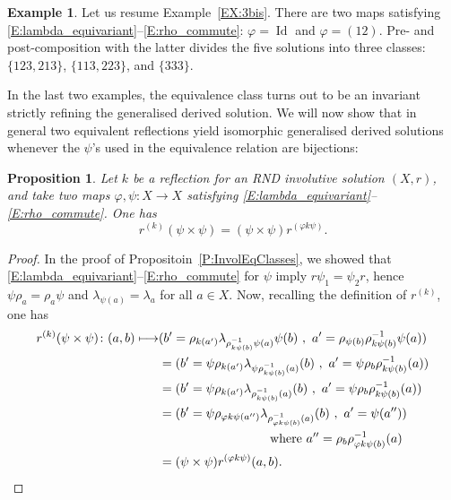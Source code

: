 \documentclass{amsart}
\newcommand{\Id}{\operatorname{Id}}
\theoremstyle{plain}
\newtheorem{pro}[thm]{Proposition}
\theoremstyle{definition}
\newtheorem{exa}[thm]{Example}
\theoremstyle{remark}
\begin{document}
\begin{exa}
Let us resume Example~\ref{EX:3bis}. There are two maps satisfying \eqref{E:lambda_equivariant}--\eqref{E:rho_commute}:  $\varphi=\Id$ and $\varphi=(12)$. Pre- and post-composition with the latter divides the five solutions into three classes: $\{123,213\}$, $\{113,223\}$, and $\{333\}$.
\end{exa}

In the last two examples, the equivalence class turns out to be an invariant strictly refining the generalised derived solution. We will now show that in general two equivalent reflections yield isomorphic generalised derived solutions whenever the $\psi$'s used in the equivalence relation are bijections:

\begin{pro}\label{P:EquivReflVsDerivedSol}
Let $k$ be a reflection for an RND involutive solution $(X,r)$, and take two maps $\varphi,\psi \colon X \to X$ satisfying \eqref{E:lambda_equivariant}--\eqref{E:rho_commute}. One has
\[r^{(k)} (\psi \times \psi) = (\psi \times \psi) r^{(\varphi k \psi)}.\]
\end{pro}

\begin{proof}
In the proof of Propositoin~\ref{P:InvolEqClasses}, we showed that \eqref{E:lambda_equivariant}--\eqref{E:rho_commute} for $\psi$ imply $r\psi _1=\psi _2r$, hence $\psi \rho_a = \rho_a \psi$ and $\lambda_{\psi(a)}=\lambda_a$ for all $a \in X$. Now, recalling the definition of $r^{(k)}$, one has
\begin{align*}
r^{(k)} (\psi \times \psi) \colon (a,b) \longmapsto &(b'= \rho_{k(a')}\lambda_{\rho_{k\psi(b)}^{-1}\psi(a)}\psi(b)\ ,\ a'=  \rho_{\psi(b)}\rho_{k\psi(b)}^{-1}\psi(a))\\
&=(b' = \psi\rho_{k(a')}\lambda_{\psi\rho_{k\psi(b)}^{-1}(a)}(b)\ ,\ a'=  \psi\rho_{b}\rho_{k\psi(b)}^{-1}(a))\\
&=(b' = \psi\rho_{k(a')}\lambda_{\rho_{k\psi(b)}^{-1}(a)}(b)\ ,\ a'=  \psi\rho_{b}\rho_{k\psi(b)}^{-1}(a))\\
&= (b'= \psi \rho_{\varphi k \psi(a'')}\lambda_{\rho_{\varphi k \psi(b)}^{-1}(a)}(b)\ ,\ a'= \psi(a'')) \\
& \hspace*{3cm} \text{ where } a''= \rho_b\rho_{\varphi k \psi(b)}^{-1}(a)\\
&=(\psi \times \psi) r^{(\varphi k \psi)}(a,b). \qedhere
\end{align*}
\end{proof}
\end{document}
